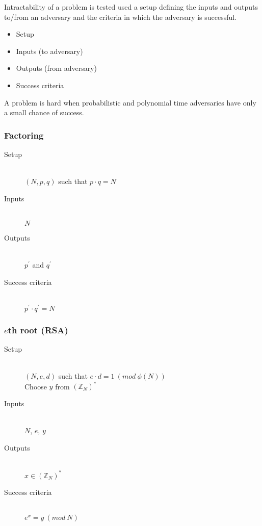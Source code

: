 \documentclass[a4paper]{article}
\begin{document}
Intractability of a problem is tested used a setup defining the inputs and
outputs to/from an adversary and the criteria in which the adversary is
successful.

\begin{itemize}
  \item Setup
  \item Inputs (to adversary)
  \item Outputs (from adversary)
  \item Success criteria
\end{itemize}

A problem is hard when probabilistic and polynomial time adversaries have only
a small chance of success.

\subsubsection{Factoring}

\begin{description}
  \item[Setup] \hfill \\
    $(N, p, q)$ such that $p \cdot q = N$
  \item[Inputs] \hfill \\
    $N$
  \item[Outputs] \hfill \\
    $p^{\prime}$ and $q^{\prime}$
  \item[Success criteria] \hfill \\
    $p^{\prime} \cdot q^{\prime} = N$
\end{description}

\subsubsection{$e$th root (RSA)}

\begin{description}
  \item[Setup] \hfill \\
    $(N, e, d)$ such that $e \cdot d = 1 \: (mod \: \phi(N))$ \\
    Choose $y$ from $(\mathbb{Z}_{N})^{*}$
  \item[Inputs] \hfill \\
    $N$, $e$, $y$
  \item[Outputs] \hfill \\
    $x \in (\mathbb{Z}_{N})^{*}$
  \item[Success criteria] \hfill \\
    $e^{x} = y \: (mod \: N)$
\end{description}
\end{document}
